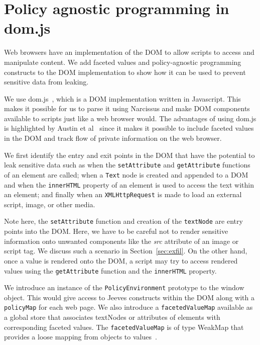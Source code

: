 \section{Policy agnostic programming in dom.js \label{sec:dom.js}}
Web browsers have an implementation of the DOM to allow scripts to
access and manipulate content. We add faceted values and policy-agnostic programming
constructs to the DOM implementation to show how it can be used to prevent
sensitive data from leaking.

We use dom.js~\cite{dom.js}, which is a DOM implementation written in Javascript.
This makes it possible for us to parse it using Narcissus and make DOM components
available to scripts just like a web browser would. The advantages of using dom.js
is highlighted by Austin et al~\cite[Section 9.3]{TOPLAS} since it makes it possible
to include faceted values in the DOM and track flow of private information on the
web browser.

We first identify the entry and exit points in the DOM that have the potential
to leak sensitive data such as when the \texttt{setAttribute} and \texttt{getAttribute}
functions of an element are called; when a \texttt{Text} node is created
and appended to a DOM and when the \texttt{innerHTML} property of an element
is used to access the text within an element; and finally when an
\texttt{XMLHttpRequest} is made to load an external script, image, or other media.

Note here, the \texttt{setAttribute} function and creation of the \texttt{textNode}
are entry points into the DOM. Here, we have to be careful not to render sensitive
information onto unwanted components like the \textit{src} attribute of an image
or script tag. We discuss such a scenario in Section~\ref{sec:exfil}. On the
other hand, once a value is rendered onto the DOM, a script may try to access rendered
values using the \texttt{getAttribute} function and the \texttt{innerHTML} property.

We introduce an instance of the \texttt{PolicyEnvironment} prototype to the window
object. This would give access to Jeeves constructs within the DOM along with a
\texttt{policyMap} for each web page. We also introduce a \texttt{facetedValueMap}
available as a global store that associates textNodes or attributes of elements
with corresponding faceted values. The \texttt{facetedValueMap} is of
type WeakMap that provides a loose mapping from objects to values~\cite{WeakMap}.

